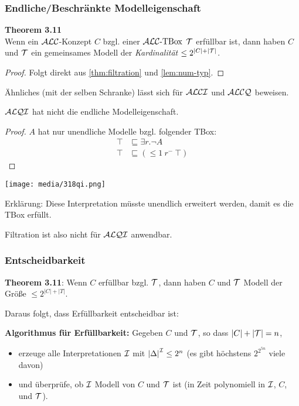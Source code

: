\subsubsection{Endliche/Beschränkte Modelleigenschaft}

\textbf{Theorem 3.11} \\
Wenn ein $\mathcal{A}\mathcal{L}\mathcal{C}$-Konzept $C$ bzgl. einer $\text{$\mathcal{A}\mathcal{L}\mathcal{C}$-TBox}$ $\mathcal{T}$ erfüllbar ist, dann haben $C$ und $\mathcal{T}$ ein gemeinsames Modell der
\emph{Kardinalität} $\leq 2^{\left| C \right| + |\mathcal{T}|}$.

\begin{proof}
    Folgt direkt aus \autoref{thm:filtration} und \autoref{lem:num-typ}.
\end{proof}

Ähnliches (mit der selben Schranke) lässt sich für $\mathcal{A}\mathcal{L}\mathcal{C}\mathcal{I}$ und $\mathcal{A}\mathcal{L}\mathcal{C}\mathcal{Q}$ beweisen.

\begin{theorem}
$\mathcal{A}\mathcal{L}\mathcal{Q}\mathcal{I}$ hat nicht die endliche Modelleigenschaft.
\end{theorem}

\begin{proof}
    $A$ hat nur unendliche Modelle bzgl. folgender TBox:
    \begin{align*}
        \top &\sqsubseteq \exists r.\neg A\\
        \top &\sqsubseteq ( \leq 1\ r^{-}\ \top)
    \end{align*}
\end{proof}
\begin{tafel}\mbox{}

\texttt{[image: media/318qi.png]}

Erklärung: Diese Interpretation müsste unendlich erweitert werden, damit es die TBox erfüllt.
\end{tafel}

Filtration ist also nicht für $\mathcal{A}\mathcal{L}\mathcal{Q}\mathcal{I}$ anwendbar.

\subsubsection{Entscheidbarkeit}
\textbf{Theorem 3.11}:
Wenn $C$ erfüllbar bzgl. $\mathcal{T}$, dann haben $C$ und $\mathcal{T}$ Modell der
Größe $\leq 2^{\left| C \right| + \left| T \right|}$.

Daraus folgt, dass Erfüllbarkeit entscheidbar ist:

\textbf{Algorithmus für Erfüllbarkeit:}
Gegeben $C$ und $\mathcal{T}$, so dass $|C|+|\mathcal{T}| = n$,
\begin{itemize} 
  \item erzeuge alle Interpretationen $\mathcal{I}$ mit $\left| \Delta \right|^{\mathcal{I}} \leq 2^{n}$ (es gibt höchstens $2^{2^{5n}}$ viele davon) 
  \item und überprüfe, ob $\mathcal{I}$ Modell von $C$ und $\mathcal{T}$ ist (in Zeit polynomiell in $\mathcal{I}$, $C$, und $\mathcal{T}$).
\end{itemize}

